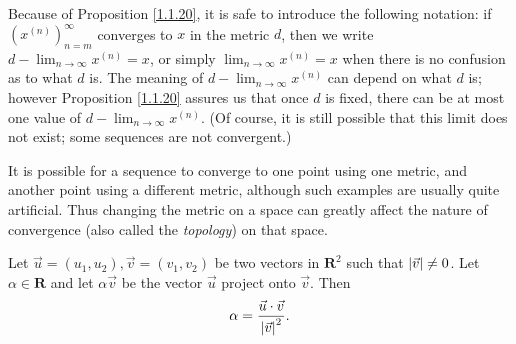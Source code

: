 \begin{note}
    Because of Proposition \ref{1.1.20}, it is safe to introduce the following notation:
    if \((x^{(n)})_{n = m}^\infty\) converges to \(x\) in the metric \(d\), then we write \(d - \lim_{n \to \infty} x^{(n)} = x\), or simply \(\lim_{n \to \infty} x^{(n)} = x\) when there is no confusion as to what \(d\) is.
    The meaning of \(d - \lim_{n \to \infty} x^{(n)}\) can depend on what \(d\) is;
    however Proposition \ref{1.1.20} assures us that once \(d\) is fixed, there can be at most one value of \(d - \lim_{n \to \infty} x^{(n)}\).
    (Of course, it is still possible that this limit does not exist;
    some sequences are not convergent.)
\end{note}

\begin{remark}\label{1.1.21}
    It is possible for a sequence to converge to one point using one metric, and another point using a different metric, although such examples are usually quite artificial.
    Thus changing the metric on a space can greatly affect the nature of convergence (also called the \emph{topology}) on that space.
\end{remark}

\begin{additional corollary}\label{ac 1.1.1}
Let \(\vec{u} = (u_1, u_2), \vec{v} = (v_1, v_2)\) be two vectors in \(\mathbf{R}^2\) such that \(\abs*{\vec{v}} \neq 0\).
Let \(\alpha \in \mathbf{R}\) and let \(\alpha \vec{v}\) be the vector \(\vec{u}\) project onto \(\vec{v}\).
Then
\[
    \alpha = \frac{\vec{u} \cdot \vec{v}}{\abs*{\vec{v}}^2}.
\]
\end{additional corollary}

